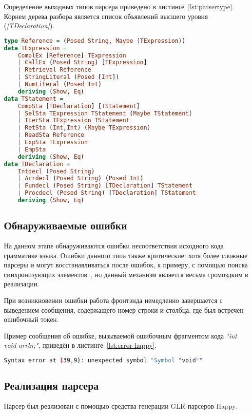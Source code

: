 \documentclass[a4paper,12pt]{report}
\numberwithin{equation}{section}
\begin{document}
Определение выходных типов парсера приведено в листинге~\ref{lst:parsertype}.
Корнем дерева разбора является список объявлений высшего уровня (\textit{[TDeclaration]}).

\begin{lstlisting}[language=haskell,caption={Выходные типы данных парсера},label=lst:parsertype]
type Reference = (Posed String, Maybe (TExpression))
data TExpression =
    ComplEx [Reference] TExpression
    | CallEx (Posed String) [TExpression]
    | Retrieval Reference
    | StringLiteral (Posed [Int])
    | NumLiteral (Posed Int)
    deriving (Show, Eq)
data TStatement =
    CompSta [TDeclaration] [TStatement]
    | SelSta TExpression TStatement (Maybe TStatement)
    | IterSta TExpression TStatement
    | RetSta (Int,Int) (Maybe TExpression)
    | ReadSta Reference
    | ExpSta TExpression
    | EmpSta
    deriving (Show, Eq)
data TDeclaration =
    Intdecl (Posed String)
    | Arrdecl (Posed String) (Posed Int)
    | Fundecl (Posed String) [TDeclaration] TStatement
    | Procdecl (Posed String) [TDeclaration] TStatement
    deriving (Show, Eq)
\end{lstlisting}

\subsection{Обнаруживаемые ошибки}
На данном этапе обнаруживаются ошибки несоответствия исходного кода грамматике языка.
Ошибки данного типа также критические: хотя более сложные парсеры и могут восстанавливаться после ошибок, к примеру, с помощью поиска синхронизующих элементов~\cite{wikiparseerror}, но данный механизм является весьма громоздким в реализации.

При возникновении ошибки работа фронтэнда немедленно завершается с выведением сообщения, содержащего номер строки и столбца, где был встречен ошибочный токен.

Пример сообщения об ошибке, вызываемой ошибочным фрагментом кода \textit{"int void arrln;"}, приведён в листинге~\ref{lst:error-happy}.

\begin{lstlisting}[language=bash,caption={Сообщение о синтаксической ошибке},label=lst:error-happy]
Syntax error at (39,9): unexpected symbol "Symbol "void""
\end{lstlisting}

\subsection{Реализация парсера}
Парсер был реализован с помощью средства генерации GLR-парсеров Happy.
\end{document}
